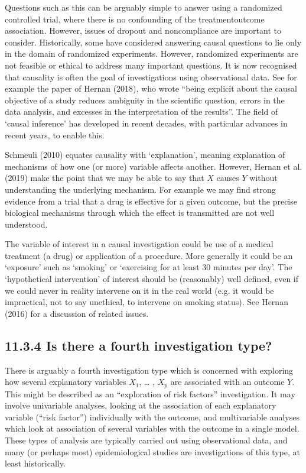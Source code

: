 \documentclass[letterpaper,10pt,english]{jupyterBook}
\begin{document}
\sphinxAtStartPar
Questions such as this can be arguably simple to answer using a randomized controlled trial, where there is no confounding of the treatment\sphinxhyphen{}outcome association. However, issues of drop\sphinxhyphen{}out and non\sphinxhyphen{}compliance are important to consider. Historically, some have considered answering causal questions to lie only in the domain of randomized experiments. However, randomized experiments are not feasible or ethical to address many important questions. It is now recognised that causality is often the goal of investigations using observational data. See for example the paper of Hernan (2018), who wrote “being explicit about the causal objective of a study reduces ambiguity in the scientific question, errors in the data analysis, and excesses in the interpretation of the results”. The field of ‘causal inference’ has developed in recent decades, with particular advances in recent years, to enable this.

\sphinxAtStartPar
Schmeuli (2010) equates causality with ‘explanation’, meaning explanation of mechanisms of how one (or more) variable affects another. However, Hernan et al. (2019) make the point that we may be able to say that \(X\) causes \(Y\) without understanding the underlying mechanism. For example we may find strong evidence from a trial that a drug is effective for a given outcome, but the precise biological mechanisms through which the effect is transmitted are not well understood.

\sphinxAtStartPar
The variable of interest in a causal investigation could be use of a medical treatment (a drug) or application of a procedure. More generally it could be an ‘exposure’ such as ‘smoking’ or ‘exercising for at least 30 minutes per day’. The ‘hypothetical intervention’ of interest should be (reasonably) well defined, even if we could never in reality intervene on it in the real world (e.g. it would be impractical, not to say unethical, to intervene on smoking status). See Hernan (2016) for a discussion of related issues.


\subsection{11.3.4 Is there a fourth investigation type?}
\label{\detokenize{11.d. Types of Investigation:is-there-a-fourth-investigation-type}}
\sphinxAtStartPar
There is arguably a fourth investigation type which is concerned with exploring how several explanatory variables \(X_{1}\), … , \(X_{p}\) are associated with an outcome \(Y\). This might be described as an “exploration of risk factors” investigation. It may involve univariable analyses, looking at the association of each explanatory variable (“risk factor”) individually with the outcome, and multivariable analyses which look at association of several variables with the outcome in a single model. These types of analysis are typically carried out using observational data, and many (or perhaps most) epidemiological studies are investigations of this type, at least historically.
\end{document}
